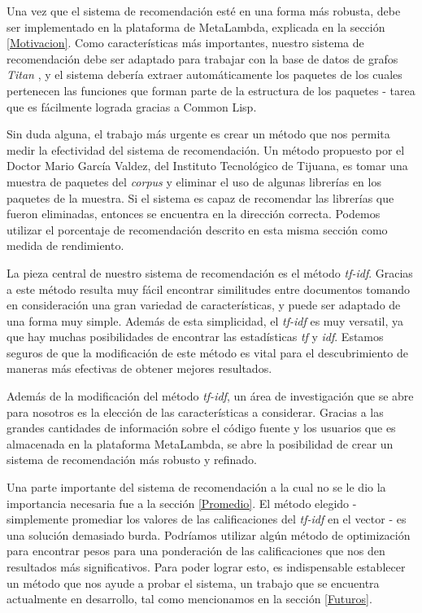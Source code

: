 \documentclass[times, 10pt,twocolumn, a4paper]{article}
\begin{document}
Una vez que el sistema de recomendaci\'on est\'e en una forma m\'as
robusta, debe ser implementado en la plataforma de MetaLambda,
explicada en la secci\'on \ref{Motivacion}. Como caracter\'isticas
m\'as importantes, nuestro sistema de recomendaci\'on debe ser
adaptado para trabajar con la base de datos de grafos \textit{Titan}
\cite{ml7}, y el sistema deber\'ia extraer autom\'aticamente los
paquetes de los cuales pertenecen las funciones que forman parte de la
estructura de los paquetes - tarea que es f\'acilmente lograda gracias
a Common Lisp.

Sin duda alguna, el trabajo m\'as urgente es crear un m\'etodo que nos
permita medir la efectividad del sistema de recomendaci\'on. Un
m\'etodo propuesto por el Doctor Mario Garc\'ia Valdez, del Instituto
Tecnol\'ogico de Tijuana, es tomar una muestra de paquetes del
\textit{corpus} y eliminar el uso de algunas librer\'ias en los
paquetes de la muestra. Si el sistema es capaz de recomendar las
librer\'ias que fueron eliminadas, entonces se encuentra en la
direcci\'on correcta. Podemos utilizar el porcentaje de
recomendaci\'on descrito en esta misma secci\'on como medida de rendimiento.


La pieza central de nuestro sistema de recomendaci\'on es el m\'etodo
\textit{tf-idf}. Gracias a este m\'etodo resulta muy f\'acil encontrar
similitudes entre documentos tomando en consideraci\'on una gran
variedad de caracter\'isticas, y puede ser adaptado de una forma
muy simple. Adem\'as de esta simplicidad, el \textit{tf-idf} es muy
versatil, ya que hay muchas posibilidades de encontrar las
estad\'isticas \textit{tf} y \textit{idf}. Estamos seguros de que la
modificaci\'on de este m\'etodo es vital para el descubrimiento de
maneras m\'as efectivas de obtener mejores resultados.

Adem\'as de la modificaci\'on del m\'etodo \textit{tf-idf}, un \'area
de investigaci\'on que se abre para nosotros es la elecci\'on de las
caracter\'isticas a considerar. Gracias a las grandes cantidades de
informaci\'on sobre el c\'odigo fuente y los usuarios que es
almacenada en la plataforma MetaLambda, se abre la posibilidad de
crear un sistema de recomendaci\'on m\'as robusto y refinado.

Una parte importante del sistema de recomendaci\'on a la cual no se le
dio la importancia necesaria fue a la secci\'on \ref{Promedio}. El
m\'etodo elegido - simplemente promediar los valores de las
calificaciones del \textit{tf-idf} en el vector - es una soluci\'on
demasiado burda. Podr\'iamos utilizar alg\'un m\'etodo de
optimizaci\'on para encontrar pesos para una ponderaci\'on de
las calificaciones que nos den resultados m\'as significativos. Para
poder lograr esto, es indispensable establecer un m\'etodo que nos
ayude a probar el sistema, un trabajo que se encuentra actualmente en
desarrollo, tal como mencionamos en la secci\'on \ref{Futuros}.
\end{document}
